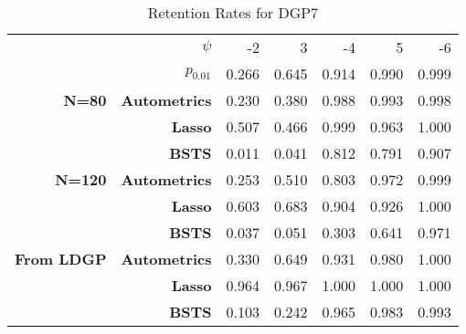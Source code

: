 \documentclass[11pt, oneside]{book}   	%
\begin{document}
\begin{table}[htbp]
  \centering

    \begin{tabular}{rrrrrrr}

          & \boldmath{}\textbf{$\psi$}\unboldmath{} & -2    & 3     & -4    & 5     & -6 \\

          & \textbf{$p_{0.01}$}\unboldmath{}  & 0.266 & 0.645 & 0.914 & 0.990 & 0.999  \\
    \textbf{N=80} & \textbf{Autometrics} & 0.230 & 0.380 & 0.988 & 0.993 & 0.998 \\
    \textbf{} & \textbf{Lasso} & 0.507 & 0.466 & 0.999 & 0.963 & 1.000 \\
    \textbf{} & \textbf{BSTS} & 0.011 & 0.041 & 0.812 & 0.791 & 0.907 \\
    \textbf{N=120} & \textbf{Autometrics} & 0.253 & 0.510 & 0.803 & 0.972 & 0.999 \\
    \textbf{} & \textbf{Lasso} & 0.603 & 0.683 & 0.904 & 0.926 & 1.000 \\
    \textbf{} & \textbf{BSTS} & 0.037 & 0.051 & 0.303 & 0.641 & 0.971 \\
    \textbf{From LDGP} & \textbf{Autometrics} & 0.330 & 0.649 & 0.931 & 0.980 & 1.000 \\
          & \textbf{Lasso} & 0.964 & 0.967 & 1.000 & 1.000 & 1.000 \\
          & \textbf{BSTS} & 0.103 & 0.242 & 0.965 & 0.983 & 0.993 \\

    \end{tabular}%
     \caption{Retention Rates for DGP7}
  \label{DGP7RetRates}%
\end{table}%
\end{document}
